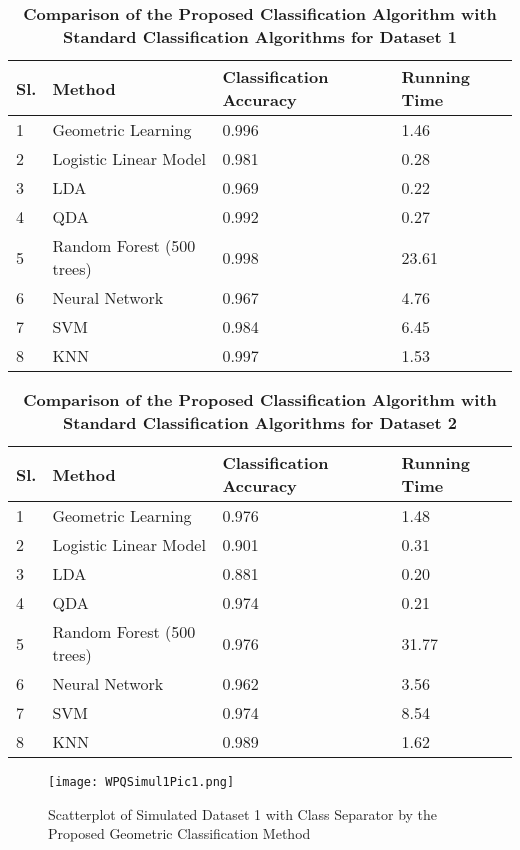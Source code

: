 \documentclass[twoside]{article}
\begin{document}
\begin{table}[h]
\begin{center}
\caption{\textbf{Comparison of the Proposed Classification Algorithm with Standard Classification Algorithms for Dataset 1 }}
\begin{tabular}{p{0.5cm}p{5.5cm}p{2.5cm}p{2cm}}\hline
Sl.&Method&Classification Accuracy&Running Time\\ \hline
1&Geometric Learning&0.996&1.46\\
2&Logistic Linear Model&0.981&0.28\\
3&LDA&0.969&0.22\\
4&QDA&0.992&0.27\\
5&Random Forest (500 trees)&0.998&23.61\\
6&Neural Network&0.967&4.76\\
7&SVM&0.984&6.45\\
8&KNN&0.997&1.53\\ \hline
\end{tabular}
\end{center}
\label{table:ComparisonTable1}
\end{table}


\begin{table}[h]
\begin{center}
\caption{\textbf{Comparison of the Proposed Classification Algorithm with Standard Classification Algorithms for Dataset 2 }}
\begin{tabular}{p{0.5cm}p{5.5cm}p{2.5cm}p{2cm}}\hline
Sl.&Method&Classification Accuracy&Running Time\\ \hline
1&Geometric Learning&0.976&1.48\\
2&Logistic Linear Model&0.901&0.31\\
3&LDA&0.881&0.20\\
4&QDA&0.974&0.21\\
5&Random Forest (500 trees)&0.976&31.77\\
6&Neural Network&0.962&3.56\\
7&SVM&0.974&8.54\\
8&KNN&0.989&1.62\\ \hline
\end{tabular}
\end{center}
\label{table:ComparisonTable2}
\end{table}


\begin{figure}[H]
\texttt{[image: WPQSimul1Pic1.png]}
\caption{Scatterplot of Simulated Dataset 1 with Class Separator by the Proposed Geometric Classification Method}
\label{fig:SimulatedExample1}
\end{figure}
\end{document}
